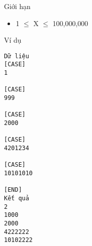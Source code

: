 Giới hạn
\begin{itemize}
	\item     1  $\le$  X  $\le$  100,000,000   
\end{itemize}
Ví dụ
\begin{verbatim}
Dữ liệu
[CASE]
1

[CASE]
999

[CASE]
2000

[CASE]
4201234

[CASE]
10101010

[END]
Kết quả
2
1000
2000
4222222
10102222
\end{verbatim}